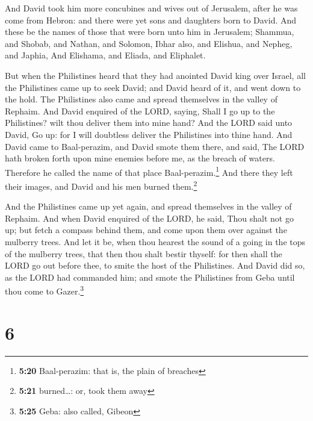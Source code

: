  And David took him more concubines and wives out of
Jerusalem, after he was come from Hebron: and there were yet sons and
daughters born to David.  And these be the names of those
that were born unto him in Jerusalem; Shammua, and Shobab, and Nathan,
and Solomon,  Ibhar also, and Elishua, and Nepheg, and
Japhia,  And Elishama, and Eliada, and Eliphalet.

 But when the Philistines heard that they had anointed
David king over Israel, all the Philistines came up to seek David; and
David heard of it, and went down to the hold.  The
Philistines also came and spread themselves in the valley of Rephaim.
 And David enquired of the LORD, saying, Shall I go up to
the Philistines? wilt thou deliver them into mine hand? And the LORD
said unto David, Go up: for I will doubtless deliver the Philistines
into thine hand.  And David came to Baal-perazim, and
David smote them there, and said, The LORD hath broken forth upon mine
enemies before me, as the breach of waters. Therefore he called the name
of that place Baal-perazim.\footnote{\textbf{5:20} Baal-perazim: that
  is, the plain of breaches}  And there they left their
images, and David and his men burned them.\footnote{\textbf{5:21}
  burned\ldots: or, took them away}

 And the Philistines came up yet again, and spread
themselves in the valley of Rephaim.  And when David
enquired of the LORD, he said, Thou shalt not go up; but fetch a compass
behind them, and come upon them over against the mulberry trees.
 And let it be, when thou hearest the sound of a going in
the tops of the mulberry trees, that then thou shalt bestir thyself: for
then shall the LORD go out before thee, to smite the host of the
Philistines.  And David did so, as the LORD had commanded
him; and smote the Philistines from Geba until thou come to
Gazer.\footnote{\textbf{5:25} Geba: also called, Gibeon}

\hypertarget{section-5}{%
\section{6}\label{section-5}}

